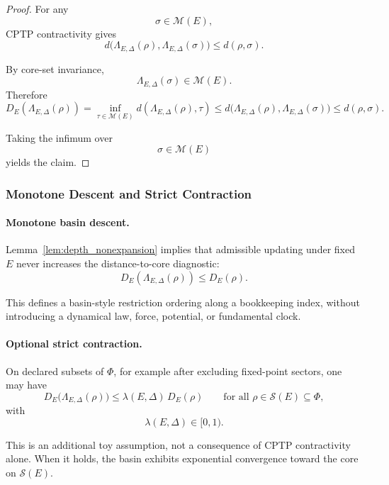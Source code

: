 \documentclass[aps,prx,onecolumn,11pt]{revtex4-2}
\theoremstyle{plain}
\theoremstyle{definition}
\theoremstyle{remark}
\begin{document}
\begin{proof}
For any
\[
\sigma\in\mathcal M(E),
\]
CPTP contractivity gives
\[
d\bigl(
\Lambda_{E,\Delta}(\rho),
\Lambda_{E,\Delta}(\sigma)
\bigr)
\leq
d(\rho,\sigma).
\]

By core-set invariance,
\[
\Lambda_{E,\Delta}(\sigma)\in\mathcal M(E).
\]
Therefore
\[
D_E(\Lambda_{E,\Delta}(\rho))
=
\inf_{\tau\in\mathcal M(E)}
d(\Lambda_{E,\Delta}(\rho),\tau)
\leq
d\bigl(
\Lambda_{E,\Delta}(\rho),
\Lambda_{E,\Delta}(\sigma)
\bigr)
\leq
d(\rho,\sigma).
\]

Taking the infimum over
\[
\sigma\in\mathcal M(E)
\]
yields the claim.
\end{proof}

\subsubsection{Monotone Descent and Strict Contraction}
\label{toy:basin_monotone_descent}

\paragraph{Monotone basin descent.}

Lemma~\ref{lem:depth_nonexpansion} implies that admissible updating
under fixed \(E\) never increases the distance-to-core diagnostic:
\[
D_E(\Lambda_{E,\Delta}(\rho))
\leq
D_E(\rho).
\]

This defines a basin-style restriction ordering along a bookkeeping
index, without introducing a dynamical law, force, potential, or
fundamental clock.

\paragraph{Optional strict contraction.}

On declared subsets of \(\Phi\), for example after excluding fixed-point
sectors, one may have
\begin{equation}
D_E\!\bigl(\Lambda_{E,\Delta}(\rho)\bigr)
\leq
\lambda(E,\Delta)\,D_E(\rho)
\qquad
\text{for all }\rho\in\mathcal S(E)\subseteq\Phi,
\label{eq:basin_strict_contraction}
\end{equation}
with
\[
\lambda(E,\Delta)\in[0,1).
\]

This is an additional toy assumption, not a consequence of CPTP
contractivity alone. When it holds, the basin exhibits exponential
convergence toward the core on \(\mathcal S(E)\).
\end{document}
